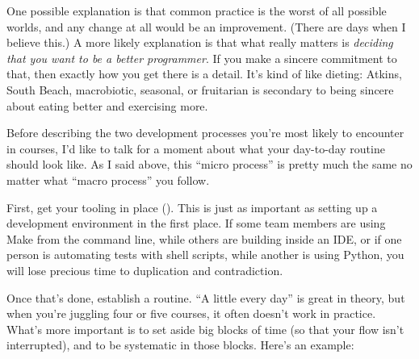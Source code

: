 \documentclass{report}
\begin{document}
One possible explanation is that common practice is the worst of all
possible worlds, and any change at all would be an improvement.
(There are days when I believe this.)  A more likely explanation is
that what really matters is \emph{deciding that you want to be a
better programmer}.  If you make a sincere commitment to that, then
exactly how you get there is a detail.  It's kind of like dieting:
Atkins, South Beach, macrobiotic, seasonal, or fruitarian is secondary
to being sincere about eating better and exercising more.


Before describing the two development processes you're most likely to
encounter in courses, I'd like to talk for a moment about what your
day-to-day routine should look like.  As I said above, this ``micro
process'' is pretty much the same no matter what ``macro process'' you
follow.

First, get your tooling in place ().  This is just
as important as setting up a development environment in the first
place.  If some team members are using Make from the command line,
while others are building inside an IDE, or if one person is
automating tests with shell scripts, while another is using Python,
you will lose precious time to duplication and contradiction.

Once that's done, establish a routine.  ``A little every day'' is
great in theory, but when you're juggling four or five courses, it
often doesn't work in practice.  What's more important is to set aside
big blocks of time (so that your flow isn't interrupted), and to be
systematic in those blocks.  Here's an example:
\end{document}
